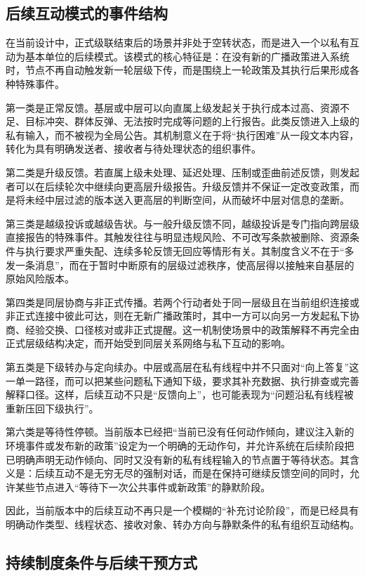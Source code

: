 \documentclass{article}
\begin{document}
\subsection{后续互动模式的事件结构}

在当前设计中，正式级联结束后的场景并非处于空转状态，而是进入一个以私有互动为基本单位的后续模式。该模式的核心特征是：在没有新的广播政策进入系统时，节点不再自动触发新一轮层级下传，而是围绕上一轮政策及其执行后果形成各种特殊事件。

第一类是正常反馈。基层或中层可以向直属上级发起关于执行成本过高、资源不足、目标冲突、群体反弹、无法按时完成等问题的上行报告。此类反馈进入上级的私有输入，而不被视为全局公告。其机制意义在于将“执行困难”从一段文本内容，转化为具有明确发送者、接收者与待处理状态的组织事件。

第二类是升级反馈。若直属上级未处理、延迟处理、压制或歪曲前述反馈，则发起者可以在后续轮次中继续向更高层升级报告。升级反馈并不保证一定改变政策，而是将未经中层过滤的版本送入更高层的判断空间，从而破坏中层对信息的垄断。

第三类是越级投诉或越级告状。与一般升级反馈不同，越级投诉是专门指向跨层级直接报告的特殊事件。其触发往往与明显违规风险、不可改写条款被删除、资源条件与执行要求严重失配、连续多轮反馈无回应等情形有关。其制度含义不在于“多发一条消息”，而在于暂时中断原有的层级过滤秩序，使高层得以接触来自基层的原始风险版本。

第四类是同层协商与非正式传播。若两个行动者处于同一层级且在当前组织连接或非正式连接中彼此可达，则在无新广播政策时，其中一方可以向另一方发起私下协商、经验交换、口径核对或非正式提醒。这一机制使场景中的政策解释不再完全由正式层级结构决定，而开始受到同层关系网络与私下互动的影响。

第五类是下级转办与定向续办。中层或高层在私有线程中并不只面对“向上答复”这一单一路径，而可以把某些问题私下通知下级，要求其补充数据、执行排查或完善解释口径。这样，后续互动不只是“反馈向上”，也可能表现为“问题沿私有线程被重新压回下级执行”。

第六类是等待性停顿。当前版本已经把“当前已没有任何动作倾向，建议注入新的环境事件或发布新的政策”设定为一个明确的无动作句，并允许系统在后续阶段把已明确声明无动作倾向、同时又没有新的私有线程输入的节点置于等待状态。其含义是：后续互动不是无穷无尽的强制对话，而是在保持可继续反馈空间的同时，允许某些节点进入“等待下一次公共事件或新政策”的静默阶段。

因此，当前版本中的后续互动不再只是一个模糊的“补充讨论阶段”，而是已经具有明确动作类型、线程状态、接收对象、转办方向与静默条件的私有组织互动结构。

\subsection{持续制度条件与后续干预方式}
\end{document}
